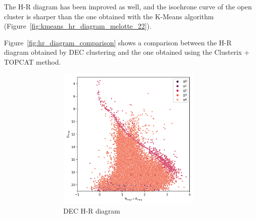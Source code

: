 \documentclass[11pt, a4paper, english]{book}
\begin{document}
The H-R diagram has been improved as well,
and the isochrone curve of the open cluster is sharper than the one obtained with the K-Means algorithm
(Figure~\ref{fig:kmeans_hr_diagram_melotte_22}).

Figure~\ref{fig:hr_diagram_comparison} shows a comparison between the H-R diagram obtained
by DEC clustering and the one obtained using the Clusterix + TOPCAT method.

\begin{figure}[htbp]
  \centering
  \begin{subfigure}{0.9\textwidth}
    \centering
    \begin{subfigure}[t]{0.45\textwidth}
      \centering
      \includegraphics[width=\textwidth]{../figures/melotte_22/dec_hr_diagram_melotte_22.png}
      \caption{DEC H-R diagram}
    \end{subfigure}
    \hfill
    \begin{subfigure}[t]{0.45\textwidth}
      \centering

\end{subfigure}
\end{subfigure}
\end{figure}
\end{document}

